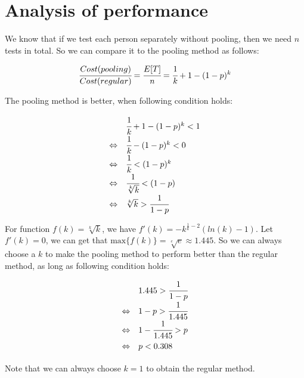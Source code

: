 
\section{Analysis of performance}

We know that if we test each person separately without pooling, then we need $n$ tests in total. So we can compare it to the pooling method as follows:

\[
  \cfrac{Cost(pooling)}{Cost(regular)} = \cfrac{E[T]}{n} = \cfrac{1}{k} + 1 - (1 - p)^k
\]

The pooling method is better, when following condition holds:

\[
\def\arraystretch{1.5}
\begin{array}{l l}
                & \cfrac{1}{k} + 1 - (1 - p)^k < 1 \\
\Leftrightarrow & \cfrac{1}{k} - (1 - p)^k < 0 \\
\Leftrightarrow & \cfrac{1}{k} < (1 - p)^k \\
\Leftrightarrow & \cfrac{1}{\sqrt[k]{k}} < (1 - p) \\
\Leftrightarrow & \sqrt[k]{k} > \cfrac{1}{1 - p} \\
\end{array}
\]

For function $f(k) = \sqrt[k]{k}$, we have $f'(k) = -k^{\frac{1}{k}-2}(ln(k) - 1)$. Let $f'(k) = 0$, we can get that $\text{max}\{f(k)\} = \sqrt[e]{e} \approx 1.445$. So we can always choose a $k$ to make the pooling method to perform better than the regular method, as long as following condition holds:

\[
\def\arraystretch{1.5}
\begin{array}{l l}
                & 1.445 > \cfrac{1}{1 - p} \\
\Leftrightarrow & 1 - p > \cfrac{1}{1.445} \\
\Leftrightarrow & 1 - \cfrac{1}{1.445} > p \\
\Leftrightarrow & p < 0.308 \\
\end{array}
\]

\noindent
Note that we can always choose $k = 1$ to obtain the regular method.
